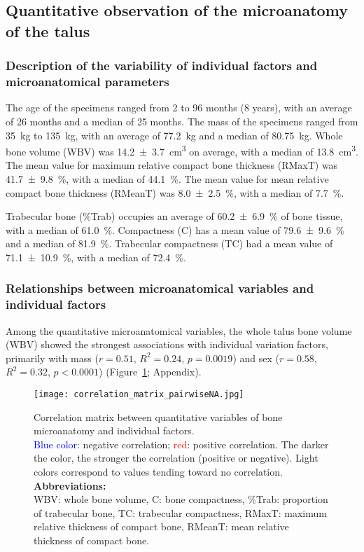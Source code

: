 \documentclass[12pt,a4paper]{article}
\begin{document}
\subsection{Quantitative observation of the microanatomy of the talus}
\subsubsection{Description of the variability of individual factors and microanatomical parameters}
The age of the specimens ranged from 2 to 96 months (8 years), with an average of 26 months and a median of 25 months. The mass of the specimens ranged from \SI{35}{\kilo\gram} to \SI{135}{\kilo\gram}, with an average of \SI{77.2}{\kilo\gram} and a median of \SI{80.75}{\kilo\gram}. Whole bone volume (WBV) was \SI{14.2 \pm 3.7}{\centi\meter\cubed} on average, with a median of \SI{13.8}{\centi\meter\cubed}. The mean value for maximum relative compact bone thickness (RMaxT) was \SI{41.7 \pm 9.8}{\percent}, with a median of \SI{44.1}{\percent}. The mean value for mean relative compact bone thickness (RMeanT) was \SI{8.0 \pm 2.5}{\percent}, with a median of \SI{7.7}{\percent}. 

Trabecular bone (\%Trab) occupies an average of \SI{60.2 \pm 6.9}{\percent} of bone tissue, with a median of \SI{61.0}{\percent}. Compactness (C) has a mean value of \SI{79.6 \pm 9.6}{\percent} and a median of \SI{81.9}{\percent}. Trabecular compactness (TC) had a mean value of \SI{71.1 \pm 10.9}{\percent}, with a median of \SI{72.4}{\percent}.
\subsubsection{Relationships between microanatomical variables and individual factors}
Among the quantitative microanatomical variables, the whole talus bone volume (WBV) showed the strongest associations with individual variation factors, primarily with mass ($r = 0.51$, $R^2 = 0.24$, $p = 0.0019$) and sex ($r = 0.58$, $R^2 = 0.32$, $p < 0.0001$) (Figure~\ref{correlation_matrix}; Appendix). 

\begin{figure}[H]
	\texttt{[image: correlation\_matrix\_pairwiseNA.jpg]}
	\caption{Correlation matrix between quantitative variables of bone microanatomy and individual factors.\\
\textcolor{blue}{Blue color}: negative correlation; \textcolor{red}{red}: positive correlation. The darker the color, the stronger the correlation (positive or negative). Light colors correspond to values tending toward no correlation. \\
\textbf{Abbreviations:} \\
WBV: whole bone volume, C: bone compactness, \%Trab: proportion of trabecular bone, TC: trabecular compactness, RMaxT: maximum relative thickness of compact bone, RMeanT: mean relative thickness of compact bone. \\}
	\label{correlation_matrix}
\end{figure}
\end{document}
